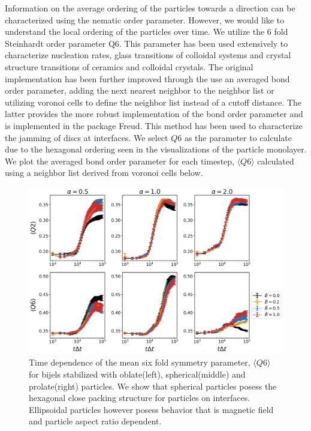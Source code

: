 Information on the average ordering of the particles towards a
direction can be characterized using the nematic order parameter.
\cite{veerman_phase_1992, gunther_timescales_2014} However, we would
like to understand the local ordering of the particles over time. We
utilize the 6 fold Steinhardt order parameter Q6.
\cite{steinhardt_bond-orientational_1983, lechner_accurate_2008, mickel_shortcomings_2013} 
This parameter has been used extensively to characterize nucleation
rates, glass transitions of colloidal systems and crystal structure
transitions of ceramics and colloidal crystals.
\cite{vagberg_glassiness_2011, besseling_three-dimensional_2007, schall_structural_2007}
The original implementation has been further improved through the use an
averaged bond order parameter, adding the next nearest neighbor to the
neighbor list or utilizing voronoi cells to define the neighbor list
instead of a cutoff distance. The latter provides the more robust
implementation of the bond order parameter and is implemented in the
package Freud. \cite{ramasubramani_freud_2020} This method has been used
to characterize the jamming of discs at interfaces.
\cite{ozawa_jamming_2012} We select \(Q6\) as the parameter to calculate
due to the hexagonal ordering seen in the visualizations of the particle
monolayer. We plot the averaged bond order parameter for each timestep,
\(\langle Q6 \rangle\) calculated using a neighbor list derived from
voronoi cells below.

\begin{figure} 
    \centering 
    \includegraphics[width=\columnwidth]{figures/results/paper1/steinhardt_vs_coverage.png} 
    \caption{Time dependence of the mean six fold symmetry parameter, $\langle Q6 \rangle$ for bijels 
    stabilized with oblate(left), spherical(middle) and prolate(right) particles. We show that spherical 
    particles posess the hexagonal close packing structure for particles on interfaces. Ellipsoidal particles 
    however posess behavior that is magnetic field and particle aspect ratio dependent.} 
    \label{fig:Q6_coverage} 
\end{figure}

